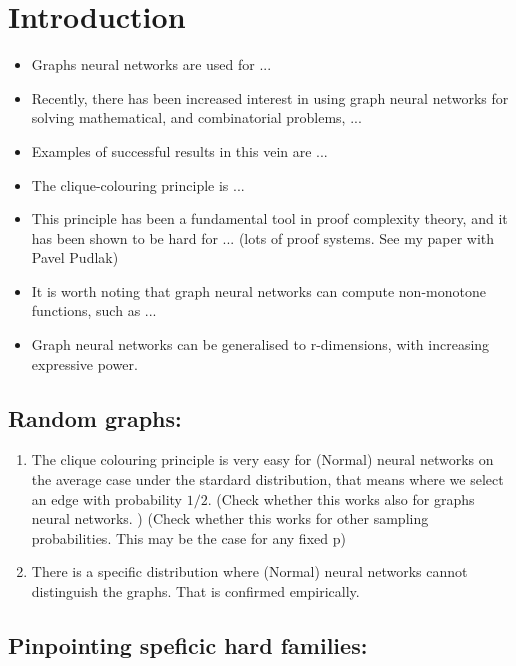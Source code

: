 \section{Introduction}
\begin{itemize}
    \item Graphs neural networks are used for ... 
    \item Recently, there has been increased interest in using graph neural networks for solving mathematical, and combinatorial problems, ... 

    \item Examples of successful results in this vein are ... 
    \item The clique-colouring principle is ... 
    \item This principle has been a fundamental tool in proof complexity theory, and it has been shown to be hard for ... (lots of proof systems. See my paper with Pavel Pudlak)
    \item It is worth noting that graph neural networks can compute non-monotone functions, such as ... 
    \item Graph neural networks can be generalised to r-dimensions, with increasing expressive power. 

\end{itemize}

\subsection{Random graphs: }

\begin{enumerate}
    \item The clique colouring principle is very easy for (Normal) neural networks on the average case under the stardard distribution, that means where we select an edge with probability $1/2$. 
         (Check whether this works also for graphs neural networks. )
         (Check whether this works for other sampling probabilities. This may be the case for any fixed p)
         
    \item There is a specific distribution where (Normal) neural networks cannot distinguish the graphs. That is confirmed empirically.
        
\end{enumerate}


\subsection{Pinpointing speficic hard families:} 

